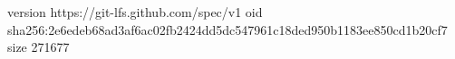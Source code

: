version https://git-lfs.github.com/spec/v1
oid sha256:2e6edeb68ad3af6ac02fb2424dd5dc547961c18ded950b1183ee850cd1b20cf7
size 271677
